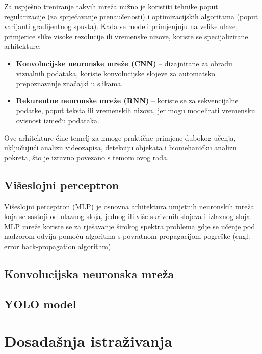 \documentclass[zavrsnirad]{fer}
\begin{document}
Za uspješno treniranje takvih mreža nužno je koristiti tehnike poput regularizacije (za sprječavanje prenaučenosti) i optimizacijskih algoritama (poput varijanti gradijentnog spusta). 
Kada se modeli primjenjuju na velike ulaze, primjerice slike visoke rezolucije ili vremenske nizove, koriste se specijalizirane arhitekture:
\begin{itemize}
  \item \textbf{Konvolucijske neuronske mreže (CNN)} – dizajnirane za obradu vizualnih podataka, koriste konvolucijske slojeve za automatsko prepoznavanje značajki u slikama.
  \item \textbf{Rekurentne neuronske mreže (RNN)} – koriste se za sekvencijalne podatke, poput teksta ili vremenskih nizova, jer mogu modelirati vremensku ovisnost između podataka.
\end{itemize}

Ove arhitekture čine temelj za mnoge praktične primjene dubokog učenja, uključujući analizu videozapisa, detekciju objekata i biomehaničku analizu pokreta, što je izravno povezano s temom ovog rada.

\subsection{Višeslojni perceptron}
\label{pog:viseslojni_perceptron}
Višeslojni perceptron (MLP) je osnovna arhitektura umjetnih neuronskih mreža koja se sastoji od ulaznog sloja, jednog ili više skrivenih slojeva i izlaznog sloja.
MLP mreže koriste se za rješavanje širokog spektra problema gdje se učenje pod nadzorom odvija pomoću algoritma s povratnom propagacijom pogreške (engl. error back-propagation algorithm).
\subsection{Konvolucijska neuronska mreža}
\label{pog:konvolucijska_neuronska_mreza}

\subsection{YOLO model}
\label{pog:yolo_model}


\section{Dosadašnja istraživanja}
\label{pog:dosadasnja_istrazivanja}

\end{document}

